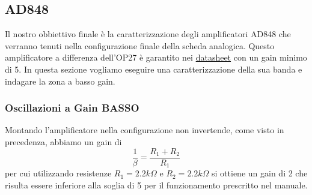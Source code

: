 \pagebreak
\subsection{AD848}

Il nostro obbiettivo finale è la caratterizzazione degli amplificatori AD848 che verranno tenuti nella configurazione finale della scheda analogica.
Questo amplificatore a differenza dell'OP27 è garantito nei \href{https://www.analog.com/media/en/technical-documentation/data-sheets/AD848.pdf}{datasheet} con un gain minimo di 5. In questa sezione vogliamo eseguire una caratterizzazione della sua banda e indagare la zona a basso gain.

\subsubsection{Oscillazioni a Gain BASSO}

Montando l'amplificatore nella configurazione non invertende, come visto in precedenza, abbiamo un gain di $$\frac{1}{\beta} = \frac{R_1+R_2}{R_1}$$ per cui utilizzando resistenze $R_1 = 2.2k\Omega$ e $R_2 = 2.2k\Omega$ si ottiene un gain di 2 che risulta essere inferiore alla soglia di 5 per il funzionamento prescritto nel manuale.

